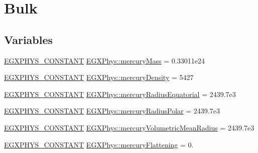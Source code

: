 \hypertarget{group___e_g_x_phys-_constants-_astrophysics-_solar_system-_mercury-_bulk}{}\section{Bulk}
\label{group___e_g_x_phys-_constants-_astrophysics-_solar_system-_mercury-_bulk}
\subsection*{Variables}
\begin{DoxyCompactItemize}
\item 
\mbox{\hyperlink{group___e_g_x_phys-_constants-_macros_ga76980d288494ce1714c9ac68a95ba702}{E\+G\+X\+P\+H\+Y\+S\+\_\+\+C\+O\+N\+S\+T\+A\+NT}} \mbox{\hyperlink{group___e_g_x_phys-_constants-_astrophysics-_solar_system-_mercury-_bulk_gaa73eef341356108966e9633c7a70a992}{E\+G\+X\+Phys\+::mercury\+Mass}} = 0.\+33011e24
\item 
\mbox{\hyperlink{group___e_g_x_phys-_constants-_macros_ga76980d288494ce1714c9ac68a95ba702}{E\+G\+X\+P\+H\+Y\+S\+\_\+\+C\+O\+N\+S\+T\+A\+NT}} \mbox{\hyperlink{group___e_g_x_phys-_constants-_astrophysics-_solar_system-_mercury-_bulk_gaa8b80e89b6cce05310b9651b527c465b}{E\+G\+X\+Phys\+::mercury\+Density}} = 5427
\item 
\mbox{\hyperlink{group___e_g_x_phys-_constants-_macros_ga76980d288494ce1714c9ac68a95ba702}{E\+G\+X\+P\+H\+Y\+S\+\_\+\+C\+O\+N\+S\+T\+A\+NT}} \mbox{\hyperlink{group___e_g_x_phys-_constants-_astrophysics-_solar_system-_mercury-_bulk_ga393f8b6ff7abcaec833aed015879dc98}{E\+G\+X\+Phys\+::mercury\+Radius\+Equatorial}} = 2439.\+7e3
\item 
\mbox{\hyperlink{group___e_g_x_phys-_constants-_macros_ga76980d288494ce1714c9ac68a95ba702}{E\+G\+X\+P\+H\+Y\+S\+\_\+\+C\+O\+N\+S\+T\+A\+NT}} \mbox{\hyperlink{group___e_g_x_phys-_constants-_astrophysics-_solar_system-_mercury-_bulk_ga09f4dddb4a5d0f0e539d5fcddfb5b45c}{E\+G\+X\+Phys\+::mercury\+Radius\+Polar}} = 2439.\+7e3
\item 
\mbox{\hyperlink{group___e_g_x_phys-_constants-_macros_ga76980d288494ce1714c9ac68a95ba702}{E\+G\+X\+P\+H\+Y\+S\+\_\+\+C\+O\+N\+S\+T\+A\+NT}} \mbox{\hyperlink{group___e_g_x_phys-_constants-_astrophysics-_solar_system-_mercury-_bulk_ga3197bd79c6b461faceffb859933c580f}{E\+G\+X\+Phys\+::mercury\+Volumetric\+Mean\+Radius}} = 2439.\+7e3
\item 
\mbox{\hyperlink{group___e_g_x_phys-_constants-_macros_ga76980d288494ce1714c9ac68a95ba702}{E\+G\+X\+P\+H\+Y\+S\+\_\+\+C\+O\+N\+S\+T\+A\+NT}} \mbox{\hyperlink{group___e_g_x_phys-_constants-_astrophysics-_solar_system-_mercury-_bulk_gab49932a46762c50bdbad579ea1b891bd}{E\+G\+X\+Phys\+::mercury\+Flattening}} = 0.

\end{DoxyCompactItemize}
